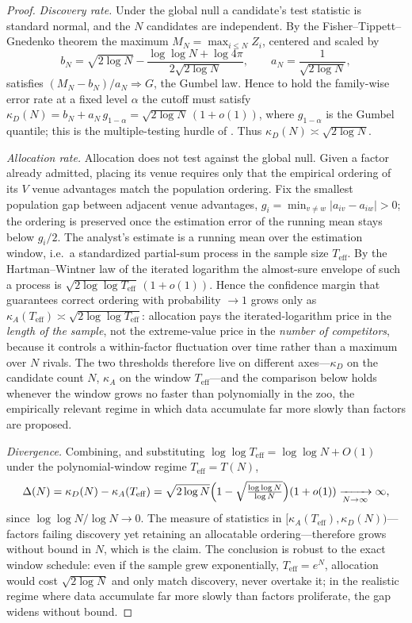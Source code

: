 \documentclass[12pt]{article}
\theoremstyle{plain}
\theoremstyle{definition}
\begin{document}
\begin{proof}
\emph{Discovery rate.} Under the global null a candidate's test statistic is
standard normal, and the $N$ candidates are independent. By the
Fisher--Tippett--Gnedenko theorem the maximum $M_N=\max_{i\le N}Z_i$, centered
and scaled by
\[
b_N=\sqrt{2\log N}-\frac{\log\log N+\log 4\pi}{2\sqrt{2\log N}},\qquad
a_N=\frac1{\sqrt{2\log N}},
\]
satisfies $(M_N-b_N)/a_N\Rightarrow G$, the Gumbel law. Hence to hold the
family-wise error rate at a fixed level $\alpha$ the cutoff must satisfy
$\kappa_D(N)=b_N+a_N\,g_{1-\alpha}=\sqrt{2\log N}\,(1+o(1))$, where
$g_{1-\alpha}$ is the Gumbel quantile; this is the multiple-testing hurdle of
\citet{HarveyLiuZhu2016}. Thus $\kappa_D(N)\asymp\sqrt{2\log N}$.

\emph{Allocation rate.} Allocation does not test against the global null. Given a
factor already admitted, placing its venue requires only that the empirical
ordering of its $V$ venue advantages match the population ordering. Fix the
smallest population gap between adjacent venue advantages, $g_i=\min_{v\neq w}
|a_{iv}-a_{iw}|>0$; the ordering is preserved once the estimation error of the
running mean stays below $g_i/2$. The analyst's estimate is a running mean over
the estimation window, i.e.\ a standardized partial-sum process in the sample
size $T_{\mathrm{eff}}$. By the Hartman--Wintner law of the iterated logarithm
the almost-sure envelope of such a process is $\sqrt{2\log\log T_{\mathrm{eff}}}\,
(1+o(1))$. Hence the confidence margin that guarantees correct ordering with
probability $\to1$ grows only as $\kappa_A(T_{\mathrm{eff}})\asymp
\sqrt{2\log\log T_{\mathrm{eff}}}$: allocation pays the iterated-logarithm price
in the \emph{length of the sample}, not the extreme-value price in the
\emph{number of competitors}, because it controls a within-factor fluctuation
over time rather than a maximum over $N$ rivals. The two thresholds therefore
live on different axes---$\kappa_D$ on the candidate count $N$, $\kappa_A$ on the
window $T_{\mathrm{eff}}$---and the comparison below holds whenever the window
grows no faster than polynomially in the zoo, the empirically relevant regime in
which data accumulate far more slowly than factors are proposed.

\emph{Divergence.} Combining, and substituting $\log\log T_{\mathrm{eff}}
=\log\log N+O(1)$ under the polynomial-window regime $T_{\mathrm{eff}}=T(N)$,
\[
\Delta(N)=\kappa_D(N)-\kappa_A(T_{\mathrm{eff}})
=\sqrt{2\log N}\Bigl(1-\sqrt{\tfrac{\log\log N}{\log N}}\Bigr)(1+o(1))
\xrightarrow[N\to\infty]{}\infty,
\]
since $\log\log N/\log N\to0$. The measure of statistics in
$[\kappa_A(T_{\mathrm{eff}}),\kappa_D(N))$---factors failing discovery yet
retaining an allocatable ordering---therefore grows without bound in $N$, which
is the claim. The conclusion is robust to the exact window schedule: even if the
sample grew exponentially, $T_{\mathrm{eff}}=e^{N}$, allocation would cost
$\sqrt{2\log N}$ and only match discovery, never overtake it; in the realistic
regime where data accumulate far more slowly than factors proliferate, the gap
widens without bound.
\end{proof}
\end{document}
